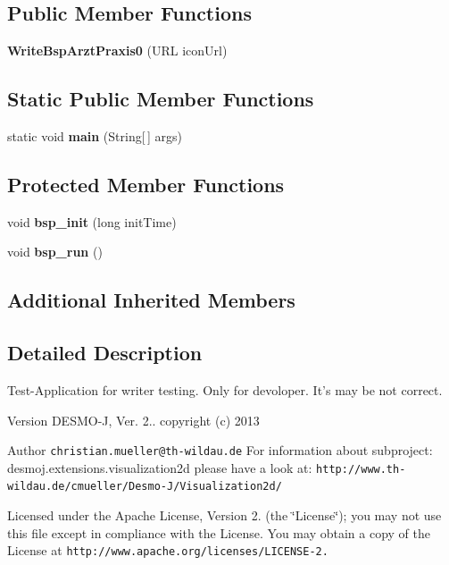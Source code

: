 \subsection*{Public Member Functions}
\begin{DoxyCompactItemize}
\item 
{\bfseries Write\-Bsp\-Arzt\-Praxis0} (U\-R\-L icon\-Url)\label{classdesmoj_1_1extensions_1_1visualization2d_1_1engine_1_1_write_bsp_arzt_praxis0_a1acef50568d5e1dee6ddddc2e50d7742}

\end{DoxyCompactItemize}
\subsection*{Static Public Member Functions}
\begin{DoxyCompactItemize}
\item 
static void {\bfseries main} (String[$\,$] args)\label{classdesmoj_1_1extensions_1_1visualization2d_1_1engine_1_1_write_bsp_arzt_praxis0_a0976f7afcd42cf2d72c35b976310e6c0}

\end{DoxyCompactItemize}
\subsection*{Protected Member Functions}
\begin{DoxyCompactItemize}
\item 
void {\bf bsp\-\_\-init} (long init\-Time)
\item 
void {\bf bsp\-\_\-run} ()
\end{DoxyCompactItemize}
\subsection*{Additional Inherited Members}


\subsection{Detailed Description}
Test-\/\-Application for writer testing. Only for devoloper. It's may be not correct.

\begin{DoxyVersion}{Version}
D\-E\-S\-M\-O-\/\-J, Ver. 2.. copyright (c) 2013 
\end{DoxyVersion}
\begin{DoxyAuthor}{Author}
{\tt christian.\-mueller@th-\/wildau.\-de} For information about subproject\-: desmoj.\-extensions.\-visualization2d please have a look at\-: {\tt http\-://www.\-th-\/wildau.\-de/cmueller/\-Desmo-\/\-J/\-Visualization2d/}
\end{DoxyAuthor}
Licensed under the Apache License, Version 2. (the \char`\"{}\-License\char`\"{}); you may not use this file except in compliance with the License. You may obtain a copy of the License at {\tt http\-://www.\-apache.\-org/licenses/\-L\-I\-C\-E\-N\-S\-E-\/2.}

